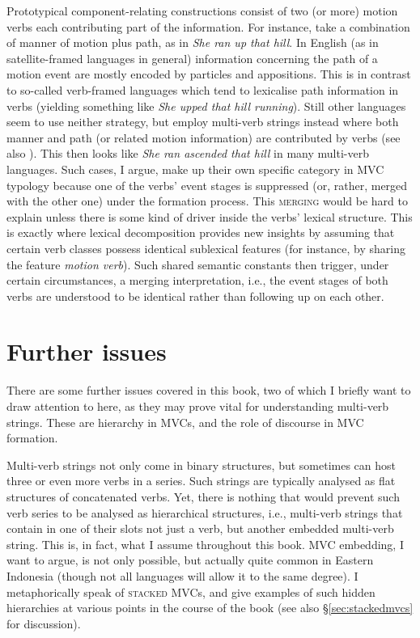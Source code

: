Prototypical component-relating constructions consist of two (or more) motion verbs each contributing part of the information. For instance, take a combination of manner of motion plus path, as in \textit{She ran up that hill}. In English (as in satellite-framed languages in general) information concerning the path of a motion event are mostly encoded by particles and appositions. This is in contrast to so-called verb-framed languages which tend to lexicalise path information in verbs (yielding something like \textit{She upped that hill running}). Still other languages seem to use neither strategy, but employ multi-verb strings instead where both manner and path (or related motion information) are contributed by verbs (see also \citealt{Ameka2013}). This then looks like \textit{She ran ascended that hill} in many multi-verb languages. Such cases, I argue, make up their own specific category in MVC typology because one of the verbs' event stages is suppressed (or, rather, merged with the other one) under the formation process. This \textsc{merging} would be hard to explain unless there is some kind of driver inside the verbs' lexical structure. This is exactly where lexical decomposition provides new insights by assuming that certain verb classes possess identical sublexical features (for instance, by sharing the feature \textit{motion verb}). Such shared semantic constants then trigger, under certain circumstances, a merging interpretation, i.e., the event stages of both verbs are understood to be identical rather than following up on each other.

\section*{Further issues}

There are some further issues covered in this book, two of which I briefly want to draw attention to here, as they may prove vital for understanding multi-verb strings. These are hierarchy in MVCs, and the role of discourse in MVC formation.

Multi-verb strings not only come in binary structures, but sometimes can host three or even more verbs in a series. Such strings are typically analysed as flat structures of concatenated verbs. Yet, there is nothing that would prevent such verb series to be analysed as hierarchical structures, i.e., multi-verb strings that contain in one of their slots not just a verb, but another embedded multi-verb string. This is, in fact, what I assume throughout this book. MVC embedding, I want to argue, is not only possible, but actually quite common in Eastern Indonesia (though not all languages will allow it to the same degree). I metaphorically speak of \textsc{stacked MVC}s, and give examples of such hidden hierarchies at various points in the course of the book (see also §\ref{sec:stackedmvcs} for discussion).

